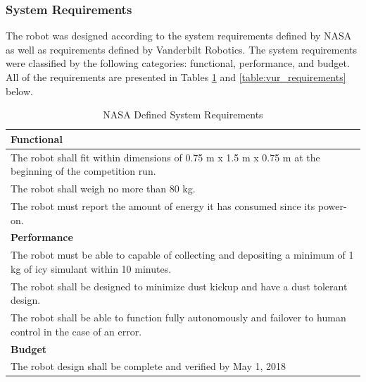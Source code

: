 \documentclass[class=article, crop=false]{standalone}
\begin{document}
	\subsubsection{System Requirements}
	The robot was designed according to the system requirements defined by NASA as well as requirements defined by Vanderbilt Robotics. The system requirements were classified by the following categories: functional, performance, and budget. All of the requirements are presented in Tables \ref{table:nasa_requirements} and  \ref{table:vur_requirements} below.
	\FloatBarrier
	\begin{table}[h]
	\centering
	\begin{tabular}{ | m{38em} | } 
 	\hline
 		\textbf{Functional} \\ 
 		\hline
 		The robot shall fit within dimensions of 0.75 m x 1.5 m x 0.75 m at the beginning of the competition run. \\ 
 		\hline
 		The robot shall weigh no more than 80 kg. \\ 
 		\hline
 		The robot must report the amount of energy it has consumed since its power-on. \\
 		\hline
 		\textbf{Performance} \\ 
 		\hline
 		The robot must be able to capable of collecting and depositing a minimum of 1 kg of icy simulant within 10 minutes. \\
 		\hline
 		The robot shall be designed to minimize dust kickup and have a dust tolerant design.  \\
 		\hline
 		The robot shall be able to function fully autonomously and failover to human control in the case of an error. \\
 		\hline
 		\textbf{Budget} \\
 		\hline
		The robot design shall be complete and verified by May 1, 2018 \\
 	\hline
	\end{tabular}
	\caption{NASA Defined System Requirements}
		\label{table:nasa_requirements}
	\end{table}
	\FloatBarrier
	
\end{document}
